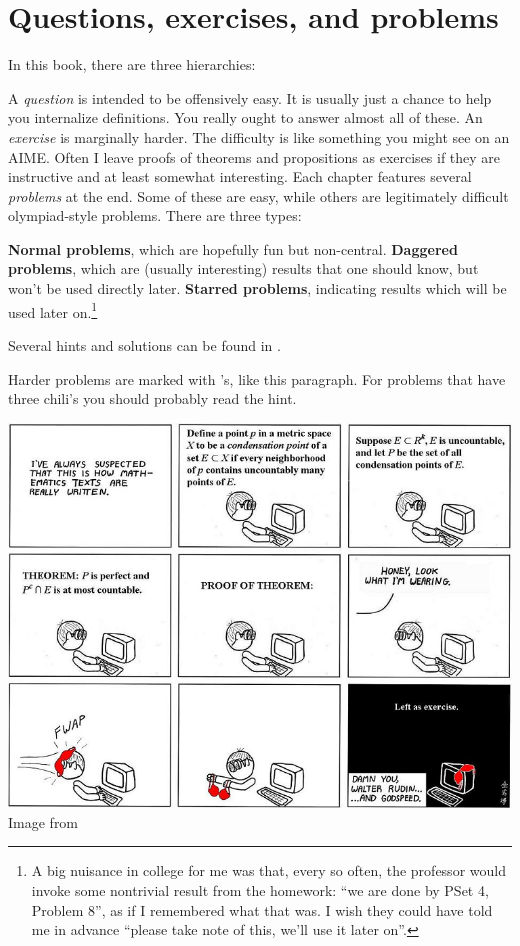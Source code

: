 \eject

\section{Questions, exercises, and problems}
In this book, there are three hierarchies:
\begin{itemize}
	\ii A \emph{question} is intended to be offensively easy.
	It is usually just a chance to help you internalize definitions.
	You really ought to answer almost all of these.
	\ii An \emph{exercise} is marginally harder.
	The difficulty is like something you might see on an AIME.
	Often I leave proofs of theorems and propositions as exercises
	if they are instructive and at least somewhat interesting.
	\ii Each chapter features several \emph{problems} at the end.
	Some of these are easy, while others are
	legitimately difficult olympiad-style problems.
	There are three types:
	\begin{itemize}
		\ii \textbf{Normal problems},
		which are hopefully fun but non-central.
		\ii \textbf{Daggered problems},
		which are (usually interesting) results that one should know,
		but won't be used directly later.
		\ii \textbf{Starred problems},
		indicating results which will be used later on.\footnote{%
			A big nuisance in college for me was that,
			every so often, the professor
			would invoke some nontrivial result from the homework:
			``we are done by PSet 4, Problem 8'',
			as if I remembered what that was.
			I wish they could have told me in advance
			``please take note of this, we'll use it later on''.
		}
	\end{itemize}
\end{itemize}
Several hints and solutions can be found in .

\gim
Harder problems are marked with \chili's, like this paragraph.
For problems that have three chili's you should probably read the hint.

\begin{center}
	\includegraphics[width=14cm]{media/abstruse-goose-exercise.png}
	\\ \scriptsize Image from \cite{img:exercise}
\end{center}

